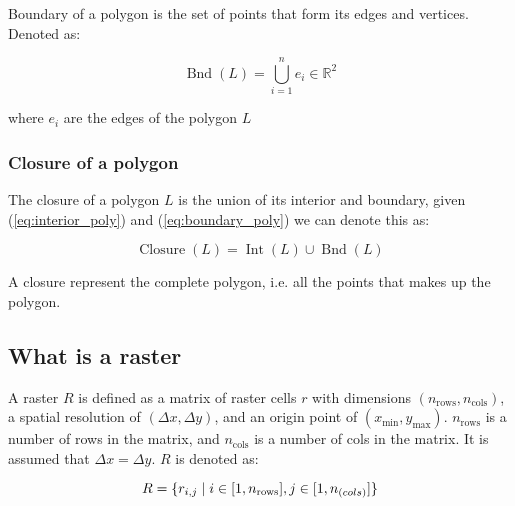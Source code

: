 \documentclass{article}
\begin{document}
Boundary of a polygon is the set of points that form its edges and vertices. Denoted as:

\begin{equation} \label{eq:boundary_poly}
    \operatorname{Bnd}(L) = \bigcup_{i=1}^{n}{e_i} \in \mathbb{R}^2
\end{equation}

where ${e_i}$ are the edges of the polygon $L$

\subsubsection{Closure of a polygon}

The closure of a polygon $L$ is the union of its interior and boundary, given (\ref{eq:interior_poly}) and (\ref{eq:boundary_poly}) we can denote this as:

\begin{equation}
    \operatorname{Closure}(L) = \operatorname{Int}(L) \cup \operatorname{Bnd}(L)
\end{equation}

A closure represent the complete polygon, i.e. all the points that makes up the polygon.


\subsection{What is a raster}

A raster $R$ is defined as a matrix of raster cells $r$ with dimensions $(n_\text{rows}, n_\text{cols})$, a spatial resolution of $(\Delta{x},\Delta{y})$, and an origin point of $(x_\text{min}, y_\text{max})$. $n_\text{rows}$ is a number of rows in the matrix, and $n_\text{cols}$ is a number of cols in the matrix. It is assumed that $\Delta{x} = \Delta{y}$. $R$ is denoted as:

\begin{equation} \label{eq:raster_def}
    R = \{r_{i,j} \mid i \in [1, n_\text{rows}], j \in [1, n_{\text(cols)}]\}
\end{equation}



\end{document}
